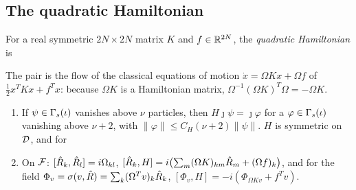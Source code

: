 \begin{vetqenv}
\subsection{The quadratic Hamiltonian}\label{sec:qh-ham}

\begin{definition}\label{def:qh-ham}
For a real symmetric $2N\times2N$ matrix $K$ and $f\in\mathbb R^{2N}$, the \emph{quadratic Hamiltonian} is 
\end{definition}

The pair  is the flow of the classical equations of motion $\dot x=\Omega Kx+\Omega f$ of $\tfrac12x^TKx+f^Tx$:
 because $\Omega K$ is a Hamiltonian
matrix, $\Omega^{-1}(\Omega K)^T\Omega=-\Omega K$. 

\begin{lemma}\label{lem:qh-ham}
\begin{enumerate}
\item[(a)] If $\psi\in\Gamma_s(\iota)$ vanishes above $\nu$ particles, then $H\jmath\psi=\jmath\varphi$ for a $\varphi\in\Gamma_s(\iota)$ vanishing above $\nu+2$, with
$\lVert\varphi\rVert\le C_H(\nu+2)\lVert\psi\rVert$. $H$ is symmetric on $\mathcal D$, and for 
\item[(b)] On $\mathcal F$: $[\hat R_k,\hat R_l]=i\Omega_{kl}$, $[\hat R_k,H]=i\bigl(\sum_m(\Omega K)_{km}\hat R_m+(\Omega f)_k\bigr)$, and for the field
$\Phi_v=\sigma(v,\hat R)=\sum_k(\Omega^Tv)_k\hat R_k$, $[\Phi_v,H]=-i(\Phi_{\Omega Kv}+f^Tv)$.
\end{enumerate}
\end{lemma}


\end{vetqenv}

